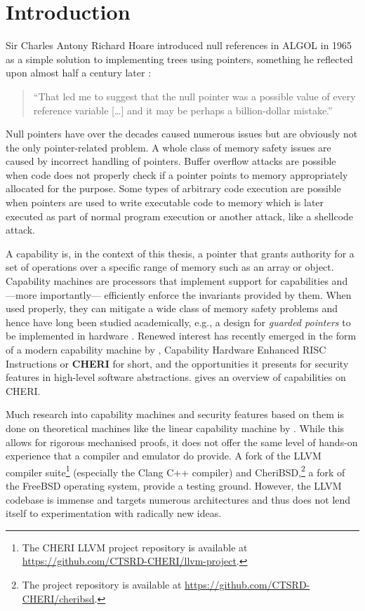 \documentclass[main.tex]{subfiles}
\begin{document}
\onlyinsubfile{\mainmatter{}}

\chapter{Introduction}
Sir Charles Antony Richard Hoare introduced null references in ALGOL in 1965 as a simple solution to implementing trees using pointers, something he reflected upon almost half a century later \citep{null}:
\begin{quote}
	\enquote{That led me to suggest that the null pointer was a possible value of every reference variable […] and it may be perhaps a billion-dollar mistake.}
\end{quote}

Null pointers have over the decades caused numerous issues but are obviously not the only pointer-related problem. A whole class of memory safety issues are caused by incorrect handling of pointers. Buffer overflow attacks are possible when code does not properly check if a pointer points to memory appropriately allocated for the purpose. Some types of arbitrary code execution are possible when pointers are used to write executable code to memory which is later executed as part of normal program execution or another attack, like a shellcode attack.

A capability is, in the context of this thesis, a pointer that grants authority for a set of operations over a specific range of memory such as an array or object. Capability machines are processors that implement support for capabilities and —more importantly— efficiently enforce the invariants provided by them. When used properly, they can mitigate a wide class of memory safety problems and hence have long been studied academically, e.g., a design for \emph{guarded pointers} to be implemented in hardware \citep{guardedptrs}. Renewed interest has recently emerged in the form of a modern capability machine by \citet{intro2cheri}, Capability Hardware Enhanced RISC Instructions or \textbf{CHERI} for short, and the opportunities it presents for security features in high-level software abstractions.  gives an overview of capabilities on CHERI.

Much research into capability machines and security features based on them is done on theoretical machines like the linear capability machine by \citet{stktokens}. While this allows for rigorous mechanised proofs, it does not offer the same level of hands-on experience that a compiler and emulator do provide. A fork of the LLVM compiler suite\footnote{The CHERI LLVM project repository is available at \url{https://github.com/CTSRD-CHERI/llvm-project}.} (especially the Clang C++ compiler) and CheriBSD,\footnote{The project repository is available at \url{https://github.com/CTSRD-CHERI/cheribsd}.} a fork of the FreeBSD operating system, provide a testing ground. However, the LLVM codebase is immense and targets numerous architectures and thus does not lend itself to experimentation with radically new ideas.
\end{document}

